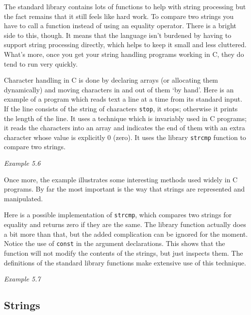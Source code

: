   The standard library contains lots of functions to help with string
   processing but the fact remains that it still feels like hard work. To
   compare two strings you have to call a function instead of using an
   equality operator. There is a bright side to this, though. It means that
   the language isn't burdened by having to support string processing
   directly, which helps to keep it small and less cluttered. What's more,
   once you get your string handling programs working in C, they do tend to
   run very quickly.


  Character handling in C is done by declaring arrays (or allocating them
   dynamically) and moving characters in and out of them `by hand'.
   Here is an example of a program which reads text a line at a time from
   its standard input. If the line consists of the string of characters
   \texttt{stop}, it stops; otherwise it prints the length of the line.
   It uses a technique which is invariably used in C programs; it reads the
   characters into an array and indicates the end of them with an extra
   character whose value is explicitly 0 (zero). It uses the library
   \texttt{strcmp} function to compare two strings.


  \begin{center}\textit{Example 5.6}\end{center}


  Once more, the example illustrates some interesting methods used widely
   in C programs. By far the most important is the way that strings are
   represented and manipulated.


  Here is a possible implementation of \texttt{strcmp}, which
   compares two strings for equality and returns zero if they are the same.
   The library function actually does a bit more than that, but the added
   complication can be ignored for the moment. Notice the use of
   \texttt{const} in the argument declarations. This shows that the
   function will not modify the contents of the strings, but just inspects
   them. The definitions of the standard library functions make extensive
   use of this technique.


  \begin{center}\textit{Example 5.7}\end{center}


  \subsection{Strings}
   

